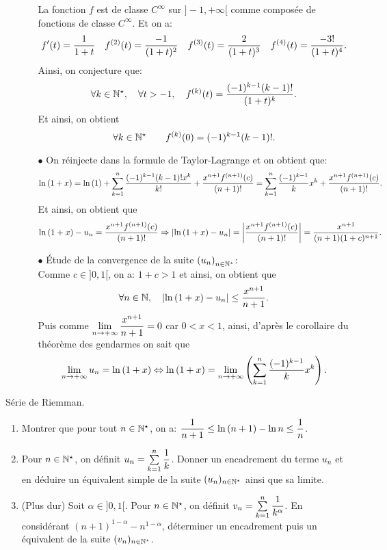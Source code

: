 \documentclass[a4paper, 11pt,reqno]{article}
\begin{document}
\begin{correction}
\begin{enumerate}
\begin{itemize}
			            \noindent La fonction $f$ est de classe $C^{\infty}$ sur $\rbrack -1,+\infty\lbrack$ comme compos\'ee de fonctions de classe $C^{\infty}$. Et on a:
			            $$f^{\prime}(t)=\displaystyle\frac{1}{1+t}\quad f^{(2)}(t)=\displaystyle\frac{-1}{(1+t)^2}\quad f^{(3)}(t)=\displaystyle\frac{2}{(1+t)^3}\quad f^{(4)}(t)=\displaystyle\frac{-3!}{(1+t)^4}.$$
			            Ainsi, on conjecture que:
			            $$\forall k\in\mathbb{N}^{\star},\quad \forall t>-1,\quad f^{(k)}(t)=\displaystyle\frac{(-1)^{k-1} (k-1)!}{(1+t)^k}.$$
			            Et ainsi, on obtient
			            $$\forall k\in\mathbb{N}^{\star}\qquad f^{(k)}(0)=(-1)^{k-1} (k-1)!.$$
			      \item[$\bullet$]  On r\'einjecte dans la formule de Taylor-Lagrange et on obtient que:
			            $$\ln{(1+x)}=\ln{(1)}+ \sum\limits_{k=1}^n \displaystyle\frac{(-1)^{k-1}(k-1)!x^k}{k!} +\displaystyle\frac{x^{n+1}f^{(n+1)}(c)}{(n+1)!}=\sum\limits_{k=1}^n \displaystyle\frac{(-1)^{k-1}}{k}x^k +\displaystyle\frac{x^{n+1}f^{(n+1)}(c)}{(n+1)!}.$$
			            Et ainsi, on obtient que
			            $$\ln{(1+x)}-u_n=\displaystyle\frac{x^{n+1}f^{(n+1)}(c)}{(n+1)!}\Rightarrow \left| \ln{(1+x)}-u_n \right|=\left| \displaystyle\frac{x^{n+1}f^{(n+1)}(c)}{(n+1)!} \right|=\displaystyle\frac{x^{n+1}}{(n+1) (1+c)^{n+1}}.$$
			      \item[$\bullet$]  \'Etude de la convergence de la suite $\left(u_n\right)_{n\in\mathbb{N}^{\star}}$:\\
			            \noindent Comme $c\in\rbrack 0,1\lbrack$, on a: $1+c>1$ et ainsi, on obtient que
			            $$\forall n\in\mathbb{N},\quad \left| \ln{(1+x)}-u_n\right|\leq \displaystyle\frac{x^{n+1}}{n+1}.$$
			            Puis comme $\lim\limits_{n\to +\infty} \displaystyle\frac{x^{n+1}}{n+1}=0$ car $0<x<1$, ainsi, d'apr\`es le corollaire du th\'eor\`eme des gendarmes on sait que
			            $$\lim\limits_{n\to +\infty} u_n=\ln{(1+x)}\Leftrightarrow \ln{(1+x)}=\lim\limits_{n\to +\infty}\left( \sum\limits_{k=1}^n \displaystyle\frac{(-1)^{k-1}}{k} x^k\right).$$
		      \end{itemize}
	\end{enumerate}

\end{correction}
% 
\begin{exercice}  \; S\'erie de Riemman.
	\begin{enumerate}
		\item Montrer que pour tout $n\in\mathbb{N}^{\star}$, on a: $\displaystyle\frac{1}{n+1}\leq \ln{(n+1)}-\ln{n}\leq \displaystyle\frac{1}{n}$.
		\item Pour $n\in\mathbb{N}^{\star}$, on d\'efinit $u_n=\sum\limits_{k=1}^n \displaystyle\frac{1}{k}$. Donner un encadrement du terme $u_n$ et en d\'eduire un \'equivalent simple de la suite $(u_n)_{n\in\mathbb{N}^{\star}}$ ainsi que sa limite.
		\item (Plus dur) Soit $\alpha\in\rbrack 0,1\lbrack$. Pour $n\in\mathbb{N}^{\star}$, on d\'efinit $v_n=\sum\limits_{k=1}^n \displaystyle\frac{1}{k^{\alpha}}$. En consid\'erant $(n+1)^{1-\alpha}-n^{1-\alpha}$, d\'eterminer un encadrement puis un \'equivalent de la suite $(v_n)_{n\in\mathbb{N}^{\star}}$.
	\end{enumerate}
\end{exercice}
\end{document}
